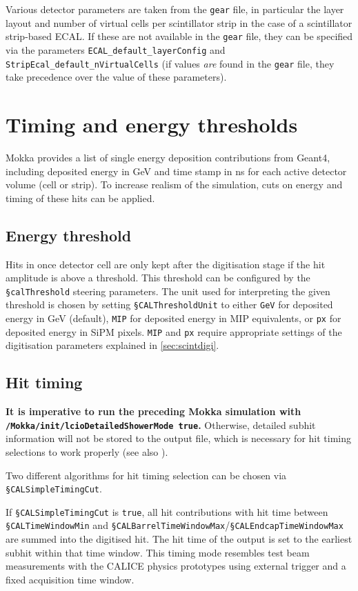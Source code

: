 \documentclass[12pt]{article} %
\begin{document}
Various detector parameters are taken from the {\tt gear} file, in particular the layer layout and number of virtual 
cells per scintillator strip in the case of a scintillator strip-based ECAL. 
If these are not available in the {\tt gear} file, they can be specified via the
parameters {\tt ECAL\_default\_layerConfig} and {\tt StripEcal\_default\_nVirtualCells} (if values {\em are} found in the 
{\tt gear} file, they take precedence over the value of these parameters).

\section{Timing and energy thresholds}
Mokka provides a list of single energy deposition contributions from Geant4, including deposited energy in GeV and time stamp in ns for each active detector volume (cell or strip). To increase realism of the simulation, cuts on energy and timing of these hits can be applied.

\subsection{Energy threshold}
Hits in once detector cell are only kept after the digitisation stage if the hit amplitude is above a threshold. This threshold can be configured by the {\tt \S calThreshold} steering parameters. 
The unit used for interpreting the given threshold is chosen by setting {\tt \S CALThresholdUnit} to either 
{\tt GeV} for deposited energy in GeV (default), 
{\tt MIP} for deposited energy in MIP equivalents, or 
{\tt px} for deposited energy in SiPM pixels. 
{\tt MIP} and {\tt px} require appropriate settings of the digitisation parameters explained in \autoref{sec:scintdigi}.

\subsection{Hit timing}
\textbf{It is imperative to run the preceding Mokka simulation with {\tt /Mokka/init/lcioDetailedShowerMode true}.}
Otherwise, detailed subhit information will not be stored to the output file, which is necessary for hit timing 
selections to work properly (see also \cite{SG_HcalOpt}).

Two different algorithms for hit timing selection can be chosen via {\tt \S CALSimpleTimingCut}.

If {\tt \S CALSimpleTimingCut} is {\tt true}, all hit contributions with hit time between 
{\tt \S CALTimeWindowMin} and {\tt \S CALBarrelTimeWindowMax}/{\tt \S CALEndcapTimeWindowMax} 
are summed into the digitised hit. The hit time of the output is set to the earliest subhit 
within that time window. This timing mode resembles test beam measurements with the CALICE 
physics prototypes using external trigger and a fixed acquisition time window.
\end{document}
